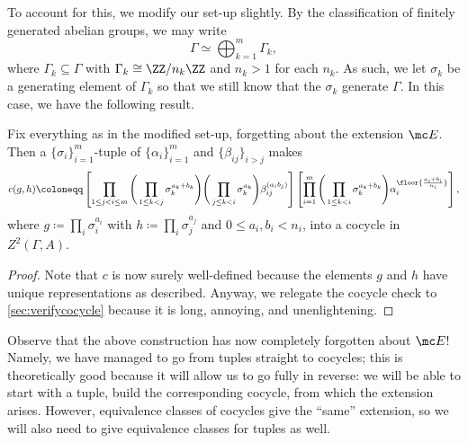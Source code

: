 \documentclass{article}
\numberwithin{equation}{section}
\begin{document}
To account for this, we modify our set-up slightly. By the classification of finitely generated abelian groups, we may write
\[\Gamma\simeq\bigoplus_{k=1}^m\Gamma_k,\]
where $\Gamma_k\subseteq\Gamma$ with $\Gamma_k\cong\ZZ/n_k\ZZ$ and $n_k>1$ for each $n_k$. As such, we let $\sigma_k$ be a generating element of $\Gamma_k$ so that we still know that the $\sigma_k$ generate $\Gamma$. In this case, we have the following result.
\begin{theorem} \label{thm:getcocycle}
	Fix everything as in the modified set-up, forgetting about the extension $\mc E$. Then a $\{\sigma_i\}_{i=1}^m$-tuple of $\{\alpha_i\}_{i=1}^m$ and $\{\beta_{ij}\}_{i>j}$ makes
	\[c(g,h)\coloneqq\left[\prod_{1\le j<i\le m}\Bigg(\prod_{1\le k<j}\sigma_k^{a_k+b_k}\Bigg)\Bigg(\prod_{j\le k<i}\sigma_k^{a_k}\Bigg)\beta_{ij}^{(a_ib_j)}\right]\left[\prod_{i=1}^m\Bigg(\prod_{1\le k<i}\sigma_k^{a_k+b_k}\Bigg)\alpha_i^{\floor{\frac{a_i+b_i}{n_i}}}\right],\]
	where $g\coloneqq\prod_i\sigma_i^{a_i}$ with $h\coloneqq\prod_i\sigma_j^{a_j}$ and $0\le a_i,b_i<n_i$, into a cocycle in $Z^2(\Gamma,A)$.
\end{theorem}
\begin{proof}
	Note that $c$ is now surely well-defined because the elements $g$ and $h$ have unique representations as described. Anyway, we relegate the cocycle check to \autoref{sec:verifycocycle} because it is long, annoying, and unenlightening.
\end{proof}
Observe that the above construction has now completely forgotten about $\mc E$! Namely, we have managed to go from tuples straight to cocycles; this is theoretically good because it will allow us to go fully in reverse: we will be able to start with a tuple, build the corresponding cocycle, from which the extension arises. However, equivalence classes of cocycles give the ``same'' extension, so we will also need to give equivalence classes for tuples as well.
\end{document}
